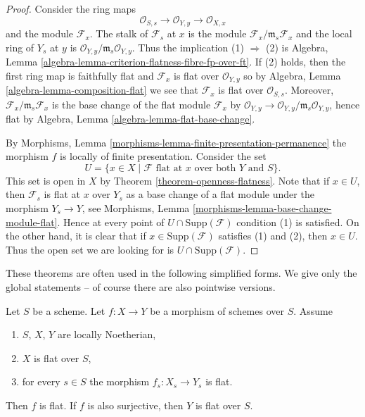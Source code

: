 \begin{proof}
Consider the ring maps
$$
\mathcal{O}_{S, s} \longrightarrow
\mathcal{O}_{Y, y} \longrightarrow \mathcal{O}_{X, x}
$$
and the module $\mathcal{F}_x$. The stalk of $\mathcal{F}_s$ at $x$
is the module $\mathcal{F}_x/\mathfrak m_s \mathcal{F}_x$ and
the local ring of $Y_s$ at $y$ is
$\mathcal{O}_{Y, y}/\mathfrak m_s \mathcal{O}_{Y, y}$.
Thus the implication (1) $\Rightarrow$ (2) is
Algebra, Lemma \ref{algebra-lemma-criterion-flatness-fibre-fp-over-ft}.
If (2) holds, then the first ring map is faithfully flat
and $\mathcal{F}_x$ is flat over $\mathcal{O}_{Y, y}$ so by
Algebra, Lemma \ref{algebra-lemma-composition-flat}
we see that $\mathcal{F}_x$ is flat over $\mathcal{O}_{S, s}$.
Moreover, $\mathcal{F}_x/\mathfrak m_s \mathcal{F}_x$ is the
base change of the flat module $\mathcal{F}_x$ by
$\mathcal{O}_{Y, y} \to \mathcal{O}_{Y, y}/\mathfrak m_s \mathcal{O}_{Y, y}$,
hence flat by
Algebra, Lemma \ref{algebra-lemma-flat-base-change}.

\medskip\noindent
By
Morphisms, Lemma \ref{morphisms-lemma-finite-presentation-permanence}
the morphism $f$ is locally of finite presentation.
Consider the set
\begin{equation}
\label{equation-open}
U = \{x \in X \mid \mathcal{F} \text{ flat at }x
\text{ over both }Y\text{ and }S\}.
\end{equation}
This set is open in $X$ by
Theorem \ref{theorem-openness-flatness}.
Note that if $x \in U$, then $\mathcal{F}_s$ is flat at
$x$ over $Y_s$ as a base change of a flat module under the
morphism $Y_s \to Y$, see
Morphisms, Lemma \ref{morphisms-lemma-base-change-module-flat}.
Hence at every point of $U \cap \text{Supp}(\mathcal{F})$
condition (1) is satisfied. On the other hand, it is
clear that if $x \in \text{Supp}(\mathcal{F})$ satisfies
(1) and (2), then $x \in U$. Thus the open set we are
looking for is $U \cap \text{Supp}(\mathcal{F})$.
\end{proof}

\noindent
These theorems are often used in the following simplified forms.
We give only the global statements -- of course there are also pointwise
versions.

\begin{lemma}
\label{lemma-morphism-between-flat-Noetherian}
Let $S$ be a scheme.
Let $f : X \to Y$ be a morphism of schemes over $S$.
Assume
\begin{enumerate}
\item $S$, $X$, $Y$ are locally Noetherian,
\item $X$ is flat over $S$,
\item for every $s \in S$ the morphism
$f_s : X_s \to Y_s$ is flat.
\end{enumerate}
Then $f$ is flat. If $f$ is also surjective, then $Y$ is flat over $S$.
\end{lemma}

